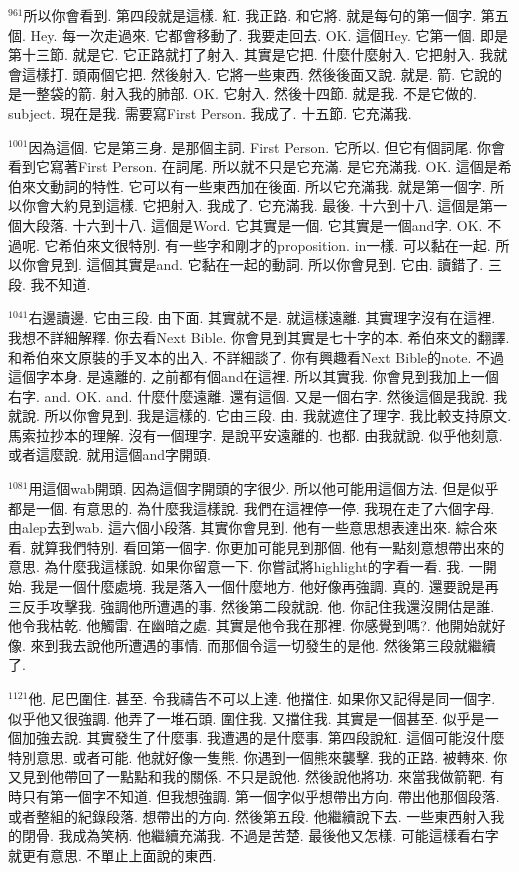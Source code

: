 \documentclass{book}
\begin{document}
$^{961}$所以你會看到.
第四段就是這樣.
紅.
我正路.
和它將.
就是每句的第一個字.
第五個.
Hey.
每一次走過來.
它都會移動了.
我要走回去.
OK.
這個Hey.
它第一個.
即是第十三節.
就是它.
它正路就打了射入.
其實是它把.
什麼什麼射入.
它把射入.
我就會這樣打.
頭兩個它把.
然後射入.
它將一些東西.
然後後面又說.
就是.
箭.
它說的是一整袋的箭.
射入我的肺部.
OK.
它射入.
然後十四節.
就是我.
不是它做的.
subject.
現在是我.
需要寫First Person.
我成了.
十五節.
它充滿我.

$^{1001}$因為這個.
它是第三身.
是那個主詞.
First Person.
它所以.
但它有個詞尾.
你會看到它寫著First Person.
在詞尾.
所以就不只是它充滿.
是它充滿我.
OK.
這個是希伯來文動詞的特性.
它可以有一些東西加在後面.
所以它充滿我.
就是第一個字.
所以你會大約見到這樣.
它把射入.
我成了.
它充滿我.
最後.
十六到十八.
這個是第一個大段落.
十六到十八.
這個是Word.
它其實是一個.
它其實是一個and字.
OK.
不過呢.
它希伯來文很特別.
有一些字和剛才的proposition.
in一樣.
可以黏在一起.
所以你會見到.
這個其實是and.
它黏在一起的動詞.
所以你會見到.
它由.
讀錯了.
三段.
我不知道.

$^{1041}$右邊讀邊.
它由三段.
由下面.
其實就不是.
就這樣遠離.
其實理字沒有在這裡.
我想不詳細解釋.
你去看Next Bible.
你會見到其實是七十字的本.
希伯來文的翻譯.
和希伯來文原裝的手叉本的出入.
不詳細談了.
你有興趣看Next Bible的note.
不過這個字本身.
是遠離的.
之前都有個and在這裡.
所以其實我.
你會見到我加上一個右字.
and.
OK.
and.
什麼什麼遠離.
還有這個.
又是一個右字.
然後這個是我說.
我就說.
所以你會見到.
我是這樣的.
它由三段.
由.
我就遮住了理字.
我比較支持原文.
馬索拉抄本的理解.
沒有一個理字.
是說平安遠離的.
也都.
由我就說.
似乎他刻意.
或者這麼說.
就用這個and字開頭.

$^{1081}$用這個wab開頭.
因為這個字開頭的字很少.
所以他可能用這個方法.
但是似乎都是一個.
有意思的.
為什麼我這樣說.
我們在這裡停一停.
我現在走了六個字母.
由alep去到wab.
這六個小段落.
其實你會見到.
他有一些意思想表達出來.
綜合來看.
就算我們特別.
看回第一個字.
你更加可能見到那個.
他有一點刻意想帶出來的意思.
為什麼我這樣說.
如果你留意一下.
你嘗試將highlight的字看一看.
我.
一開始.
我是一個什麼處境.
我是落入一個什麼地方.
他好像再強調.
真的.
還要說是再三反手攻擊我.
強調他所遭遇的事.
然後第二段就說.
他.
你記住我還沒開估是誰.
他令我枯乾.
他觸雷.
在幽暗之處.
其實是他令我在那裡.
你感覺到嗎?.
他開始就好像.
來到我去說他所遭遇的事情.
而那個令這一切發生的是他.
然後第三段就繼續了.

$^{1121}$他.
尼巴圍住.
甚至.
令我禱告不可以上達.
他擋住.
如果你又記得是同一個字.
似乎他又很強調.
他弄了一堆石頭.
圍住我.
又擋住我.
其實是一個甚至.
似乎是一個加強去說.
其實發生了什麼事.
我遭遇的是什麼事.
第四段說紅.
這個可能沒什麼特別意思.
或者可能.
他就好像一隻熊.
你遇到一個熊來襲擊.
我的正路.
被轉來.
你又見到他帶回了一點點和我的關係.
不只是說他.
然後說他將功.
來當我做箭靶.
有時只有第一個字不知道.
但我想強調.
第一個字似乎想帶出方向.
帶出他那個段落.
或者整組的紀錄段落.
想帶出的方向.
然後第五段.
他繼續說下去.
一些東西射入我的閉骨.
我成為笑柄.
他繼續充滿我.
不過是苦楚.
最後他又怎樣.
可能這樣看右字就更有意思.
不單止上面說的東西.
\end{document}
